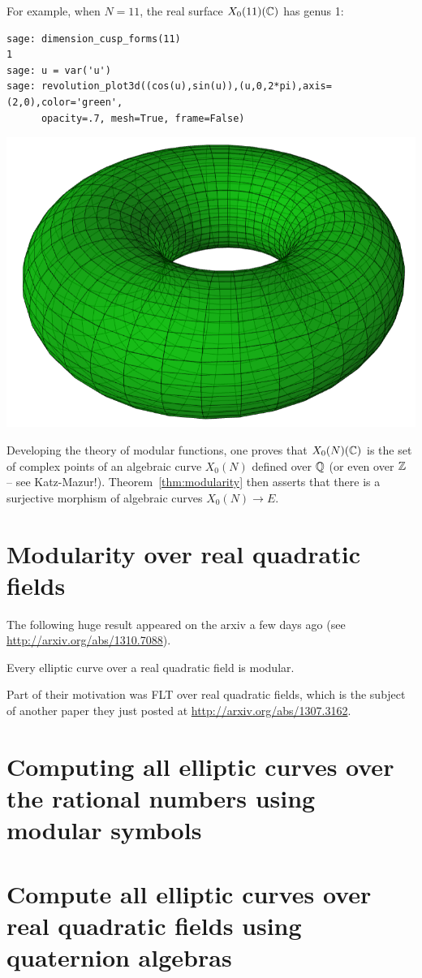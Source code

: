 \documentclass{book}
\begin{document}
For example, when $N=11$, the real surface $X_0(11)(\mathbb{C})$ has genus 1:
\begin{lstlisting}
sage: dimension_cusp_forms(11)
1
sage: u = var('u')
sage: revolution_plot3d((cos(u),sin(u)),(u,0,2*pi),axis=(2,0),color='green',
      opacity=.7, mesh=True, frame=False)
\end{lstlisting}
\begin{center}
\includegraphics[width=.7\textwidth]{pics/torus}
\end{center}


Developing the theory of modular functions, one proves that
$X_0(N)(\mathbb{C})$ is the set of complex points of an algebraic curve
$X_0(N)$ defined over $\mathbb{Q}$ (or even over $\mathbb{Z}$ -- see Katz-Mazur!).
Theorem~\ref{thm:modularity} then asserts that there is a surjective
morphism of algebraic curves $X_0(N)\to E$.

\section{Modularity over real quadratic fields}

The following huge result appeared on the arxiv a few days ago (see
\url{http://arxiv.org/abs/1310.7088}).
\begin{theorem}
Every elliptic curve over a real quadratic field is modular.
\end{theorem}
Part of their motivation was FLT over real quadratic fields, which
is the subject of another paper they just posted at \url{http://arxiv.org/abs/1307.3162}.


\section{Computing all elliptic curves over the rational numbers using modular symbols}


\section{Compute all elliptic curves over real quadratic fields using
quaternion algebras}
\end{document}

